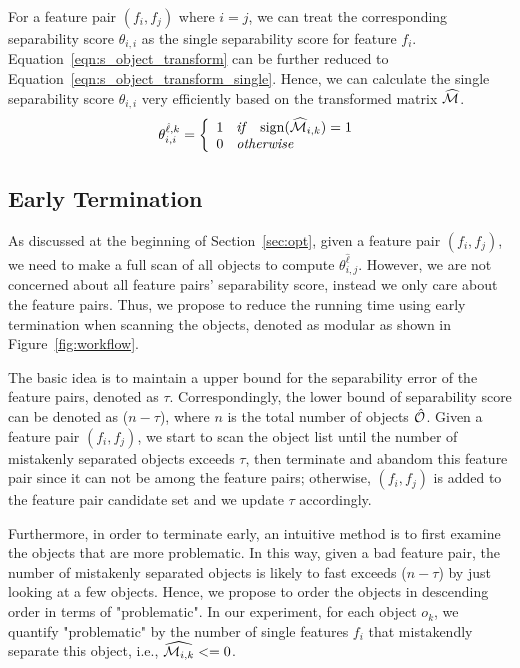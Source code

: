  For a feature pair $(f_i,f_j)$ where $i=j$, we can treat the corresponding separability score $\theta_{i,i}$ as the single separability score for feature $f_i$. Equation~\ref{eqn:s_object_transform} can be further reduced to Equation~\ref{eqn:s_object_transform_single}. Hence, we can calculate the single separability score $\theta_{i,i}$ very efficiently based on the transformed matrix $\widehat{\mm}$.
\begin{equation}\label{eqn:s_object_transform_single}
\theta_{i,i}^{\hat{\ell},k}=\left\{
                \begin{array}{ll}
                  1 \textit{\hspace{2mm} if \hspace{2mm}} \sign(\widehat{\mm}_{i,k}) = 1\\
                  0 \textit{\hspace{2mm} otherwise \hspace{2mm}} 
                \end{array}
              \right.
\end{equation}


\subsection{Early Termination} \label{ssec:earlyT}
As discussed at the beginning of Section~\ref{sec:opt}, given a feature pair $(f_i,f_j)$, we need to make a full scan of all objects to compute $\theta_{i,j}^{\hat{\ell}}$. However, we are not concerned about all feature pairs' separability score, instead we only care about the \topk feature pairs. Thus, we propose to reduce the running time using early termination when scanning the objects, denoted as \earlyT modular as shown in Figure~\ref{fig:workflow}.

 The basic idea is to maintain a upper bound for the separability error of the \topk feature pairs, denoted as $\tau$. Correspondingly, the lower bound of separability score can be denoted as ($n-\tau$), where $n$ is the total number of objects $\hat{\oo}$. Given a feature pair $(f_i,f_j)$, we start to scan the object list until the number of mistakenly separated objects exceeds $\tau$, then terminate and abandom this feature pair since it can not be among the \topk feature pairs; otherwise, $(f_i,f_j)$ is added to the feature pair candidate set and we update $\tau$ accordingly.

 Furthermore, in order to terminate early, an intuitive method is to first examine the objects that are more problematic. In this way, given a bad feature pair, the number of mistakenly separated objects is likely to fast exceeds ($n-\tau$) by just looking at a few objects. Hence, we propose to order the objects in descending order in terms of "problematic". In our experiment, for each object $o_k$, we quantify "problematic" by the number of single features $f_i$ that mistakendly separate this object, i.e., $\widehat{\mm_{i,k}}<=0$.

